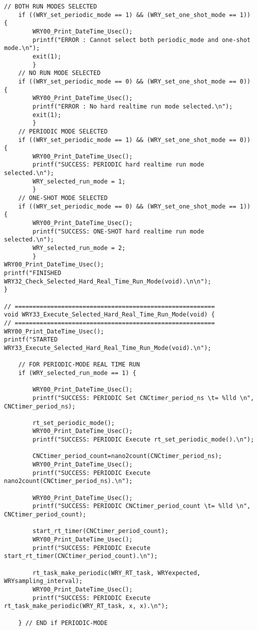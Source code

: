 \begin{lstlisting}[caption={App4-Full C-Code listing for Real Time (RTAI)}, label=App4-Full C-Code listing for Real Time (RTAI)]
	// BOTH RUN MODES SELECTED
	if ((WRY_set_periodic_mode == 1) && (WRY_set_one_shot_mode == 1)) {
		WRY00_Print_DateTime_Usec();
		printf("ERROR : Cannot select both periodic_mode and one-shot mode.\n");
		exit(1); 	
		} 
	// NO RUN MODE SELECTED
	if ((WRY_set_periodic_mode == 0) && (WRY_set_one_shot_mode == 0)) {
		WRY00_Print_DateTime_Usec();
		printf("ERROR : No hard realtime run mode selected.\n");
		exit(1); 	
		} 
	// PERIODIC MODE SELECTED
	if ((WRY_set_periodic_mode == 1) && (WRY_set_one_shot_mode == 0)) {
		WRY00_Print_DateTime_Usec();
		printf("SUCCESS: PERIODIC hard realtime run mode selected.\n");
		WRY_selected_run_mode = 1; 	
		} 
	// ONE-SHOT MODE SELECTED
	if ((WRY_set_periodic_mode == 0) && (WRY_set_one_shot_mode == 1)) {
		WRY00_Print_DateTime_Usec();
		printf("SUCCESS: ONE-SHOT hard realtime run mode selected.\n");
		WRY_selected_run_mode = 2;	
		}
WRY00_Print_DateTime_Usec(); 
printf("FINISHED WRY32_Check_Selected_Hard_Real_Time_Run_Mode(void).\n\n");
}

// ========================================================
void WRY33_Execute_Selected_Hard_Real_Time_Run_Mode(void) {
// ========================================================
WRY00_Print_DateTime_Usec(); 
printf("STARTED  WRY33_Execute_Selected_Hard_Real_Time_Run_Mode(void).\n");

	// FOR PERIODIC-MODE REAL TIME RUN
	if (WRY_selected_run_mode == 1) {
	
		WRY00_Print_DateTime_Usec();
		printf("SUCCESS: PERIODIC Set CNCtimer_period_ns \t= %lld \n", CNCtimer_period_ns);
	
		rt_set_periodic_mode();
		WRY00_Print_DateTime_Usec();
		printf("SUCCESS: PERIODIC Execute rt_set_periodic_mode().\n");

		CNCtimer_period_count=nano2count(CNCtimer_period_ns);
		WRY00_Print_DateTime_Usec();
		printf("SUCCESS: PERIODIC Execute nano2count(CNCtimer_period_ns).\n");

		WRY00_Print_DateTime_Usec();
		printf("SUCCESS: PERIODIC CNCtimer_period_count \t= %lld \n", CNCtimer_period_count);

		start_rt_timer(CNCtimer_period_count);
		WRY00_Print_DateTime_Usec();
		printf("SUCCESS: PERIODIC Execute start_rt_timer(CNCtimer_period_count).\n");

		rt_task_make_periodic(WRY_RT_task, WRYexpected, WRYsampling_interval);
		WRY00_Print_DateTime_Usec();
		printf("SUCCESS: PERIODIC Execute rt_task_make_periodic(WRY_RT_task, x, x).\n");

	} // END if PERIODIC-MODE


\end{lstlisting}
